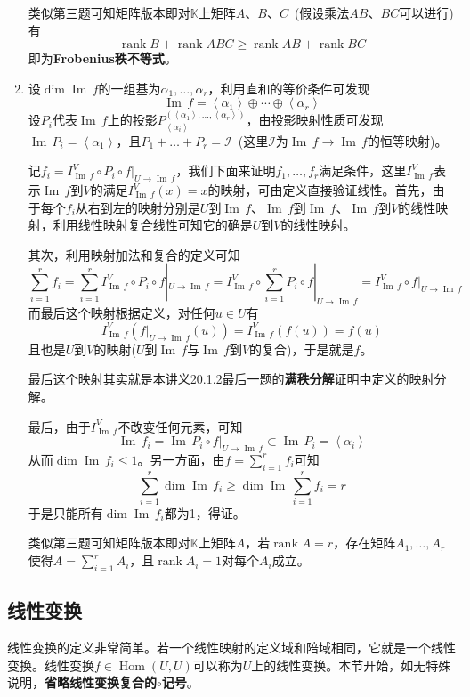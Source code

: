 \documentclass[a4paper,UTF8,fontset=windows,AutoFakeBold]{ctexart}
\DeclareMathOperator{\rank}{rank}
\DeclareMathOperator{\im}{Im\,}
\DeclareMathOperator{\Hom}{Hom}
\newcommand*{\mi}{\mathcal{I}}
\newcommand*{\note}{\noindent *}
\begin{document}
\begin{enumerate}
    类似第三题可知矩阵版本即对$\mathbb{K}$上矩阵$A$、$B$、$C$\ (假设乘法$AB$、$BC$可以进行)有
    $$\rank B+\rank ABC\ge\rank AB+\rank BC$$
    即为\textbf{Frobenius秩不等式}。

    \item
    设$\dim\im f$的一组基为$\alpha_1,\dots,\alpha_r$，利用直和的等价条件可发现
    $$\im f=\left<\alpha_1\right>\oplus\cdots\oplus\left<\alpha_r\right>$$
    设$P_i$代表$\im f$上的投影$P_{\left<\alpha_i\right>}^{(\left<\alpha_1\right>,\dots,\left<\alpha_r\right>)}$，由投影映射性质可发现$\im P_i=\left<\alpha_1\right>$，且$P_1+\dots+P_r=\mi$\ (这里$\mi$为$\im f\to\im f$的恒等映射)。

    记$f_i=I_{\im f}^V\circ P_i\circ f|_{U\to\im f}$，我们下面来证明$f_1,\dots,f_r$满足条件，这里$I_{\im f}^V$表示$\im f$到$V$的满足$I_{\im f}^V(x)=x$的映射，可由定义直接验证线性。首先，由于每个$f_i$从右到左的映射分别是$U$到$\im f$、$\im f$到$\im f$、$\im f$到$V$的线性映射，利用线性映射复合线性可知它的确是$U$到$V$的线性映射。

    其次，利用映射加法和复合的定义可知
    $$\sum_{i=1}^rf_i=\sum_{i=1}^rI_{\im f}^V\circ P_i\circ f|_{U\to\im f}=I_{\im f}^V\circ\sum_{i=1}^rP_i\circ f|_{U\to\im f}=I_{\im f}^V\circ f|_{U\to \im f}$$
    而最后这个映射根据定义，对任何$u\in U$有
    $$I_{\im f}^V(f|_{U\to \im f}(u))=I_{\im f}^V(f(u))=f(u)$$
    且也是$U$到$V$的映射($U$到$\im f$与$\im f$到$V$的复合)，于是就是$f$。

    \note 最后这个映射其实就是本讲义20.1.2最后一题的\textbf{满秩分解}证明中定义的映射分解。

    最后，由于$I_{\im f}^V$不改变任何元素，可知
    $$\im f_i=\im P_i\circ f|_{U\to\im f}\subset\im P_i=\left<\alpha_i\right>$$
    从而$\dim\im f_i\le1$。另一方面，由$f=\sum_{i=1}^rf_i$可知
    $$\sum_{i=1}^r\dim\im f_i\ge\dim\im\sum_{i=1}^rf_i=r$$
    于是只能所有$\dim\im f_i$都为1，得证。

    类似第三题可知矩阵版本即对$\mathbb{K}$上矩阵$A$，若$\rank A=r$，存在矩阵$A_1,\dots,A_r$使得$A=\sum_{i=1}^rA_i$，且$\rank A_i=1$对每个$A_i$成立。
\end{enumerate}

\subsection{线性变换}
线性变换的定义非常简单。若一个线性映射的定义域和陪域相同，它就是一个线性变换。线性变换$f\in\Hom(U,U)$可以称为$U$上的线性变换。本节开始，如无特殊说明，\textbf{省略线性变换复合的$\circ$记号}。
\end{document}
